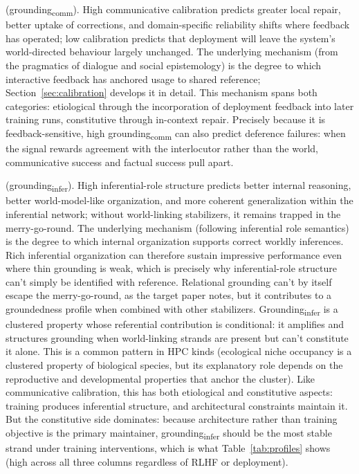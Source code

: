 \documentclass[12pt]{article}
\newcommand{\gcomm}{grounding\textsubscript{comm}}
\newcommand{\ginfer}{grounding\textsubscript{infer}}
\newcommand{\Ginfer}{Grounding\textsubscript{infer}}
\begin{document}
 (\gcomm{}). High communicative calibration predicts greater local repair, better uptake of corrections, and domain-specific reliability shifts where feedback has operated; low calibration predicts that deployment will leave the system's world-directed behaviour largely unchanged. The underlying mechanism (from the pragmatics of dialogue and social epistemology) is the degree to which interactive feedback has anchored usage to shared reference; Section~\ref{sec:calibration} develops it in detail. This mechanism spans both categories: etiological through the incorporation of deployment feedback into later training runs, constitutive through in-context repair. Precisely because it is feedback-sensitive, high \gcomm{} can also predict deference failures: when the signal rewards agreement with the interlocutor rather than the world, communicative success and factual success pull apart.

 (\ginfer{}). High inferential-role structure predicts better internal reasoning, better world-model-like organization, and more coherent generalization within the inferential network; without world-linking stabilizers, it remains trapped in the merry-go-round. The underlying mechanism (following inferential role semantics) is the degree to which internal organization supports correct worldly inferences. Rich inferential organization can therefore sustain impressive performance even where thin grounding is weak, which is precisely why inferential-role structure can't simply be identified with reference. Relational grounding can't by itself escape the merry-go-round, as the target paper notes, but it contributes to a groundedness profile when combined with other stabilizers. \Ginfer{} is a clustered property whose referential contribution is conditional: it amplifies and structures grounding when world-linking strands are present but can't constitute it alone. This is a common pattern in HPC kinds (ecological niche occupancy is a clustered property of biological species, but its explanatory role depends on the reproductive and developmental properties that anchor the cluster). Like communicative calibration, this has both etiological and constitutive aspects: training produces inferential structure, and architectural constraints maintain it. But the constitutive side dominates: because architecture rather than training objective is the primary maintainer, \ginfer{} should be the most stable strand under training interventions, which is what Table~\ref{tab:profiles} shows (high across all three columns regardless of RLHF or deployment).
\end{document}
